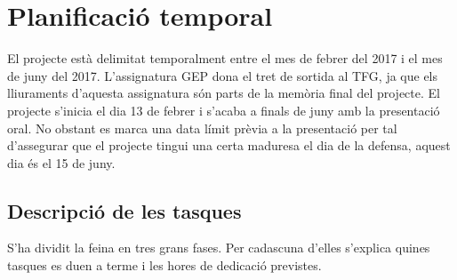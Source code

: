 
\chapter{Planificació temporal} %

\label{Planificacio} %

El projecte està delimitat temporalment entre el mes de febrer del 2017 i el
mes de juny del 2017. L'assignatura GEP dona el tret de sortida al TFG, ja que els lliuraments d'aquesta assignatura són parts de la memòria final del
projecte. El projecte s'inicia el dia 13 de febrer i s'acaba a finals de juny amb la presentació oral. No obstant es marca una data límit prèvia a la presentació per tal d'assegurar que el projecte tingui una certa maduresa el dia de la defensa, aquest dia és el 15 de juny.

\section{Descripció de les tasques}

S'ha dividit la feina en tres grans fases. Per cadascuna d'elles s'explica quines tasques es duen a terme i les hores de dedicació previstes.

